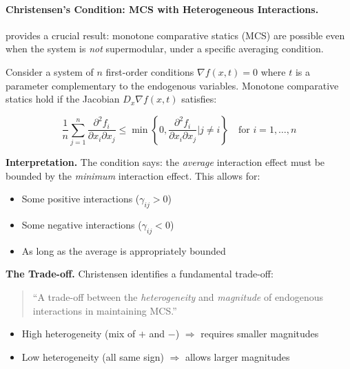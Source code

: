 \paragraph{Christensen's Condition: MCS with Heterogeneous Interactions.}

\citet{christensen2019comparative} provides a crucial result: monotone comparative 
statics (MCS) are possible even when the system is \emph{not} supermodular, 
under a specific averaging condition.

\begin{theorem}
\label{thm:christensen}
Consider a system of $n$ first-order conditions $\nabla f(x,t) = 0$ where $t$ 
is a parameter complementary to the endogenous variables. Monotone comparative 
statics hold if the Jacobian $D_x \nabla f(x,t)$ satisfies:

\begin{equation}
\boxed{
\frac{1}{n} \sum_{j=1}^{n} \frac{\partial^2 f_i}{\partial x_i \partial x_j} 
\leq \min\left\{ 0, \frac{\partial^2 f_i}{\partial x_i \partial x_j} \Big| j \neq i \right\}
\quad \text{for } i = 1, \ldots, n
}
\label{eq:christensen-condition}
\end{equation}
\end{theorem}

\textbf{Interpretation.}
The condition says: the \emph{average} interaction effect must be bounded by 
the \emph{minimum} interaction effect. This allows for:
\begin{itemize}
    \item Some positive interactions ($\gamma_{ij} > 0$)
    \item Some negative interactions ($\gamma_{ij} < 0$)
    \item As long as the average is appropriately bounded
\end{itemize}

\textbf{The Trade-off.}
Christensen identifies a fundamental trade-off:

\begin{quote}
``A trade-off between the \emph{heterogeneity} and \emph{magnitude} of 
endogenous interactions in maintaining MCS.''
\end{quote}

\begin{itemize}
    \item High heterogeneity (mix of $+$ and $-$) $\Rightarrow$ requires smaller magnitudes
    \item Low heterogeneity (all same sign) $\Rightarrow$ allows larger magnitudes
\end{itemize}

